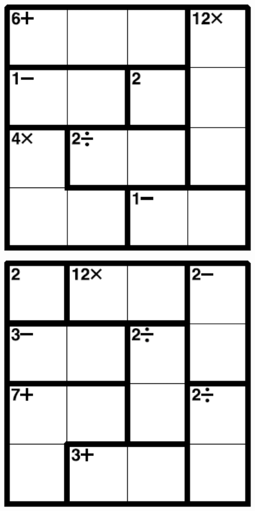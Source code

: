 
\includegraphics[scale=1]{Gambar/Lampiran/4x4_19.png}

\includegraphics[scale=1]{Gambar/Lampiran/4x4_20.png}
